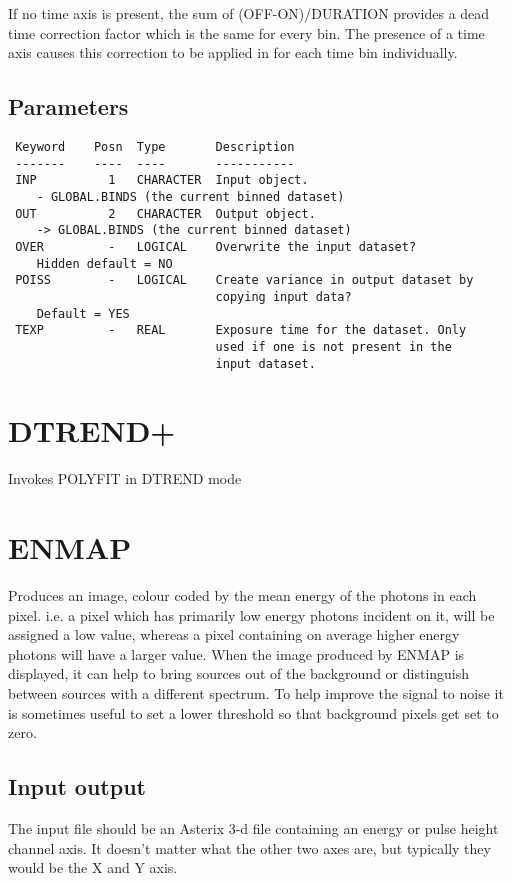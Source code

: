 \documentclass{book}
\renewcommand{\_}{{\tt\char'137}}     %
\begin{document}
If no time axis is present, the sum of (OFF-ON)/DURATION provides a
dead time correction factor which is the same for every bin. The
presence of a time axis causes this correction to be applied in for
each time bin individually.

\subsection{Parameters}
\begin{verbatim}
 Keyword    Posn  Type       Description
 -------    ----  ----       -----------
 INP          1   CHARACTER  Input object.
    - GLOBAL.BINDS (the current binned dataset)
 OUT          2   CHARACTER  Output object.
    -> GLOBAL.BINDS (the current binned dataset)
 OVER         -   LOGICAL    Overwrite the input dataset?
    Hidden default = NO
 POISS        -   LOGICAL    Create variance in output dataset by
                             copying input data?
    Default = YES
 TEXP         -   REAL       Exposure time for the dataset. Only
                             used if one is not present in the
                             input dataset.

\end{verbatim}\section{DTREND+}
Invokes POLYFIT in DTREND mode
\section{ENMAP}
Produces an image, colour coded by the mean energy of the photons
in each pixel. i.e. a pixel which has primarily low energy photons
incident on it, will be assigned a low value, whereas a pixel containing
on average higher energy photons will have a larger value. When the
image produced by ENMAP is displayed, it can help to bring sources
out of the background or distinguish between sources with a different
spectrum. To help improve the signal to noise it is sometimes useful
to set a lower threshold so that background pixels get set to zero.

\subsection{Input output}
The input file should be an Asterix 3-d file containing an energy
or pulse height channel axis. It doesn't matter what the other two axes
are, but typically they would be the X and Y axis.
\end{document}
